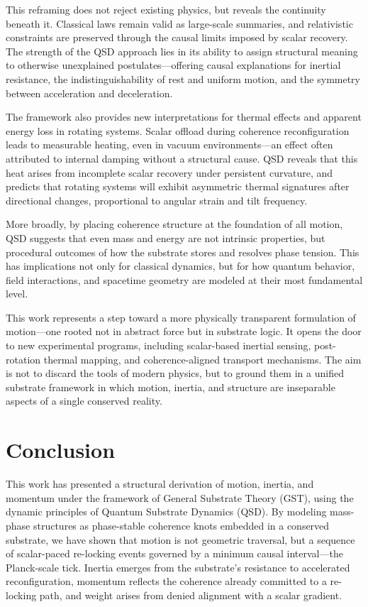 \documentclass[entropy,article,submit,pdftex,moreauthors]{Definitions/mdpi}
\begin{document}
This reframing does not reject existing physics, but reveals the continuity beneath it. Classical laws remain valid as large-scale summaries, and relativistic constraints are preserved through the causal limits imposed by scalar recovery. The strength of the QSD approach lies in its ability to assign structural meaning to otherwise unexplained postulates—offering causal explanations for inertial resistance, the indistinguishability of rest and uniform motion, and the symmetry between acceleration and deceleration.

The framework also provides new interpretations for thermal effects and apparent energy loss in rotating systems. Scalar offload during coherence reconfiguration leads to measurable heating, even in vacuum environments—an effect often attributed to internal damping without a structural cause. QSD reveals that this heat arises from incomplete scalar recovery under persistent curvature, and predicts that rotating systems will exhibit asymmetric thermal signatures after directional changes, proportional to angular strain and tilt frequency.

More broadly, by placing coherence structure at the foundation of all motion, QSD suggests that even mass and energy are not intrinsic properties, but procedural outcomes of how the substrate stores and resolves phase tension. This has implications not only for classical dynamics, but for how quantum behavior, field interactions, and spacetime geometry are modeled at their most fundamental level.

This work represents a step toward a more physically transparent formulation of motion—one rooted not in abstract force but in substrate logic. It opens the door to new experimental programs, including scalar-based inertial sensing, post-rotation thermal mapping, and coherence-aligned transport mechanisms. The aim is not to discard the tools of modern physics, but to ground them in a unified substrate framework in which motion, inertia, and structure are inseparable aspects of a single conserved reality.

\section{Conclusion}
This work has presented a structural derivation of motion, inertia, and momentum under the framework of General Substrate Theory (GST), using the dynamic principles of Quantum Substrate Dynamics (QSD). By modeling mass-phase structures as phase-stable coherence knots embedded in a conserved substrate, we have shown that motion is not geometric traversal, but a sequence of scalar-paced re-locking events governed by a minimum causal interval—the Planck-scale tick. Inertia emerges from the substrate’s resistance to accelerated reconfiguration, momentum reflects the coherence already committed to a re-locking path, and weight arises from denied alignment with a scalar gradient.
\end{document}
